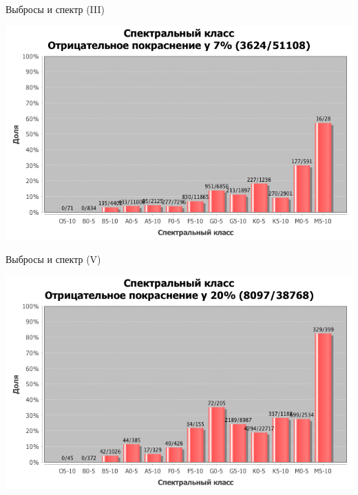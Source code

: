 \documentclass[14pt, fleqn, xcolor={dvipsnames, table}]{beamer}
\begin{document}
        \begin{frame}{Выбросы и спектр (III)}
            \begin{center}
                \includegraphics[scale=0.49]{outlier-spectIII.png}
            \end{center}             
        \end{frame} 
        
        \begin{frame}{Выбросы и спектр (V)}
            \begin{center}
                \includegraphics[scale=0.49]{outlier-spectV.png}
            \end{center}             
        \end{frame} 
        
\end{document}
